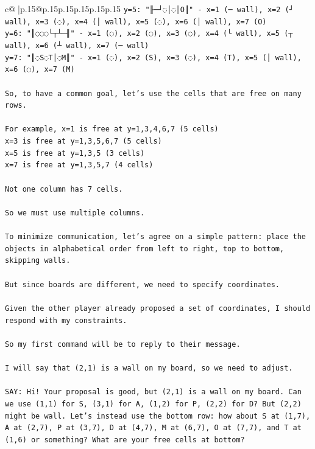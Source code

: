 \documentclass{article}
\begin{document}
{\begin{supertabular}{c@{$\;$}|p{.15\linewidth}@{}p{.15\linewidth}p{.15\linewidth}p{.15\linewidth}p{.15\linewidth}p{.15\linewidth}}
{{{\texttt{y=5: "╟─┘◌│◌│O║" {-} x=1 (─ wall), x=2 (┘ wall), x=3 (◌), x=4 (│ wall), x=5 (◌), x=6 (│ wall), x=7 (O)} \\
\texttt{y=6: "║◌◌◌└┬┴─╢" {-} x=1 (◌), x=2 (◌), x=3 (◌), x=4 (└ wall), x=5 (┬ wall), x=6 (┴ wall), x=7 (─ wall)} \\
\texttt{y=7: "║◌S◌T│◌M║" {-} x=1 (◌), x=2 (S), x=3 (◌), x=4 (T), x=5 (│ wall), x=6 (◌), x=7 (M)} \\
\\ 
\texttt{So, to have a common goal, let's use the cells that are free on many rows.} \\
\\ 
\texttt{For example, x=1 is free at y=1,3,4,6,7 (5 cells)} \\
\texttt{x=3 is free at y=1,3,5,6,7 (5 cells)} \\
\texttt{x=5 is free at y=1,3,5 (3 cells)} \\
\texttt{x=7 is free at y=1,3,5,7 (4 cells)} \\
\\ 
\texttt{Not one column has 7 cells.} \\
\\ 
\texttt{So we must use multiple columns.} \\
\\ 
\texttt{To minimize communication, let's agree on a simple pattern: place the objects in alphabetical order from left to right, top to bottom, skipping walls.} \\
\\ 
\texttt{But since boards are different, we need to specify coordinates.} \\
\\ 
\texttt{Given the other player already proposed a set of coordinates, I should respond with my constraints.} \\
\\ 
\texttt{So my first command will be to reply to their message.} \\
\\ 
\texttt{I will say that (2,1) is a wall on my board, so we need to adjust.} \\
\\ 
\texttt{SAY: Hi! Your proposal is good, but (2,1) is a wall on my board. Can we use (1,1) for S, (3,1) for A, (1,2) for P, (2,2) for D? But (2,2) might be wall. Let's instead use the bottom row: how about S at (1,7), A at (2,7), P at (3,7), D at (4,7), M at (6,7), O at (7,7), and T at (1,6) or something? What are your free cells at bottom?} \\
            }
        }
    }
     \\ \\


\end{supertabular}}
\end{document}
